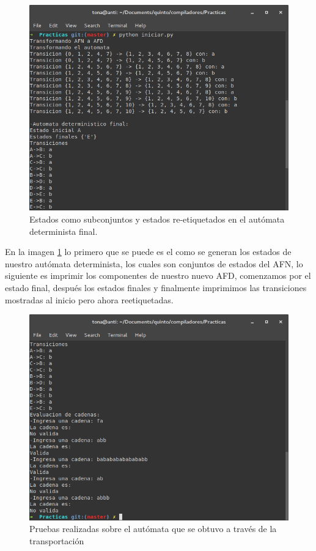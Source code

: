 \documentclass[titlepage]{article}
\begin{document}
    \begin{figure}[H]
        \begin{center}
        \includegraphics[width=\textwidth]{1.png}
        \caption{Estados como subconjuntos y estados re-etiquetados en el autómata determinista final.}
        \label{fig:creacion}
        \end{center}
    \end{figure}
    En la imagen \ref{fig:creacion} lo primero que se puede es el como se generan los estados de nuestro autómata determinista, los cuales son conjuntos de estados del AFN, lo siguiente es imprimir los componentes de nuestro nuevo AFD, comenzamos por el estado final, después los estados finales y finalmente imprimimos las transiciones mostradas al inicio pero ahora reetiquetadas.
    \begin{figure}[H]
        \begin{center}
        \includegraphics[width=\textwidth]{2.png}
        \caption{Pruebas realizadas sobre el autómata que se obtuvo a través de la transportación}
        \label{fig:pruebas}
        \end{center}
    \end{figure}
\end{document}
